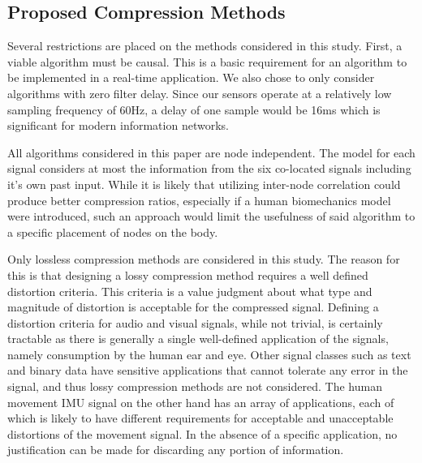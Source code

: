 \documentclass[journal]{IEEEtran}
\begin{document}
\subsection{Proposed Compression Methods}

Several restrictions are placed on the methods considered in this study. First, a viable algorithm must be causal. This is a basic requirement for an algorithm to be implemented in a real-time application. We also chose to only consider algorithms with zero filter delay. Since our sensors operate at a relatively low sampling frequency of 60Hz, a delay of one sample would be 16ms which is significant for modern information networks.

All algorithms considered in this paper are node independent. The model for each signal considers at most the information from the six co-located signals including it's own past input. While it is likely that utilizing inter-node correlation could produce better compression ratios, especially if a human biomechanics model were introduced, such an approach would limit the usefulness of said algorithm to a specific placement of nodes on the body.

Only lossless compression methods are considered in this study. The reason for this is that designing a lossy compression method requires a well defined distortion criteria\cite{Sayood2006}. This criteria is a value judgment about what type and magnitude of distortion is acceptable for the compressed signal. Defining a distortion criteria for audio and visual signals, while not trivial, is certainly tractable as there is generally a single well-defined application of the signals, namely consumption by the human ear and eye\cite{Limb1979}\cite{Painter2000}. Other signal classes such as text and binary data have sensitive applications that cannot tolerate any error in the signal, and thus lossy compression methods are not considered. The human movement IMU signal on the other hand has an array of applications, each of which is likely to have different requirements for acceptable and unacceptable distortions of the movement signal. In the absence of a specific application, no justification can be made for discarding any portion of information.
\end{document}
